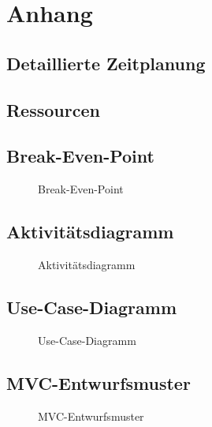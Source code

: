 \section{Anhang}
\subsection{Detaillierte Zeitplanung}
\label{app:Zeitplanung}
\clearpage

\subsection{Ressourcen}
\label{app:Ressourcen}

\clearpage

\subsection{Break-Even-Point}
\label{app:BreakEvenPoint}
\begin{figure}[!htb]
    \centering
    \caption{Break-Even-Point}
\end{figure}


\clearpage

\subsection{Aktivitätsdiagramm}
\label{app:Aktivitaet}
\begin{figure}[!htb]
    \centering
    \caption{Aktivitätsdiagramm}
\end{figure}
\clearpage

\subsection{Use-Case-Diagramm}
\label{app:UseCase}
\begin{figure}[!htb]
    \centering
    \caption{Use-Case-Diagramm}
\end{figure}
\subsection{MVC-Entwurfsmuster}
\label{app:MVC}
\begin{figure}[!h]
    \centering
    \caption{MVC-Entwurfsmuster}
\end{figure}
\clearpage

